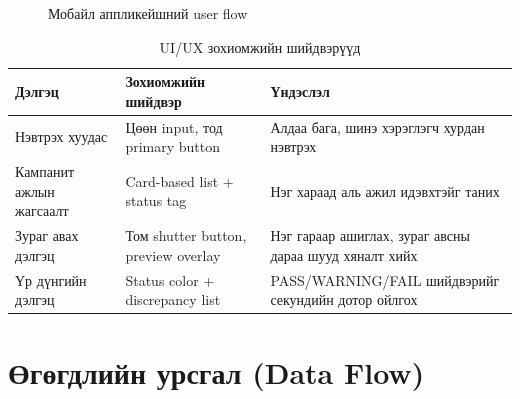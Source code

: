 \begin{figure}[H]
\centering
{}
\caption{Мобайл аппликейшний user flow}
\label{fig:mobile_user_flow}
\end{figure}

\begin{longtable}{|p{3.1cm}|p{4.2cm}|p{4.3cm}|}
\caption{UI/UX зохиомжийн шийдвэрүүд}
\label{tab:uiux_decisions} \\
\hline
\textbf{Дэлгэц} & \textbf{Зохиомжийн шийдвэр} & \textbf{Үндэслэл} \\
\hline
Нэвтрэх хуудас & Цөөн input, тод primary button & Алдаа бага, шинэ хэрэглэгч хурдан нэвтрэх \\
\hline
Кампанит ажлын жагсаалт & Card-based list + status tag & Нэг хараад аль ажил идэвхтэйг таних \\
\hline
Зураг авах дэлгэц & Том shutter button, preview overlay & Нэг гараар ашиглах, зураг авсны дараа шууд хяналт хийх \\
\hline
Үр дүнгийн дэлгэц & Status color + discrepancy list & PASS/WARNING/FAIL шийдвэрийг секундийн дотор ойлгох \\
\hline
\end{longtable}

\section{Өгөгдлийн урсгал (Data Flow)}

